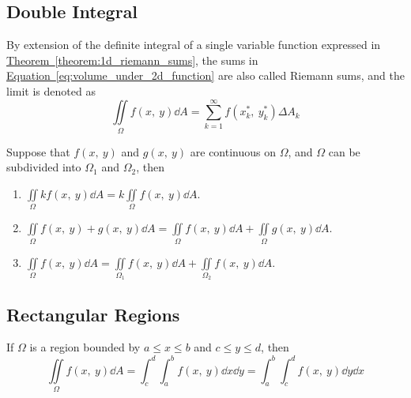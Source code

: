 \documentclass{article}
\begin{document}
\subsection{Double Integral}
\begin{definition}
    By extension of the definite integral of a single variable function expressed in
    \hyperref[theorem:1d_riemann_sums]{Theorem~\ref{theorem:1d_riemann_sums}}, the sums in
    \hyperref[eq:volume_under_2d_function]{Equation~\ref{eq:volume_under_2d_function}}
    are also called Riemann sums, and the limit is denoted as
    \begin{equation*}
        \iint\limits_{\Omega} f(x,\: y)  \dd{A}
        = \sum_{k=1}^{\infty} f(x_k^\ast,\: y_k^\ast) \Delta A_k
    \end{equation*}
\end{definition}
\begin{tcolorboxlarge}[title={Properties of Double Integrals}]
    \begin{theorem}
        Suppose that \(f(x,\: y) \) and \(g(x,\: y)\) are continuous on \(\Omega\),
        and \(\Omega\) can be subdivided into \(\Omega_1\) and \(\Omega_2\), then
        \begin{enumerate}[label=\normalfont\alph*)] %
            \item $\displaystyle\iint\limits_\Omega kf(x,\: y) \dd{A}
                      = k\iint\limits_\Omega f(x,\: y) \dd{A}$.
            \item $\displaystyle\iint\limits_\Omega f(x,\: y) + g(x,\: y) \dd{A}
                      = \iint\limits_\Omega f(x,\: y) \dd{A} + \iint\limits_\Omega g(x,\: y) \dd{A}$.
            \item $\displaystyle\iint\limits_\Omega f(x,\: y) \dd{A}
                      = \iint\limits_{\Omega_1} f(x,\: y) \dd{A} + \iint\limits_{\Omega_2} f(x,\: y) \dd{A}$.
        \end{enumerate}
    \end{theorem}
\end{tcolorboxlarge}
\subsection{Rectangular Regions}
If \(\Omega\) is a region bounded by \(a \leq x \leq b\) and \(c \leq y \leq d\), then
\begin{equation*}
    \iint\limits_{\Omega} f(x,\: y) \dd{A} = \int_c^d\int_a^b f(x,\: y) \dd{x} \dd{y} = \int_a^b\int_c^d f(x,\: y) \dd{y} \dd{x}
\end{equation*}
\end{document}
